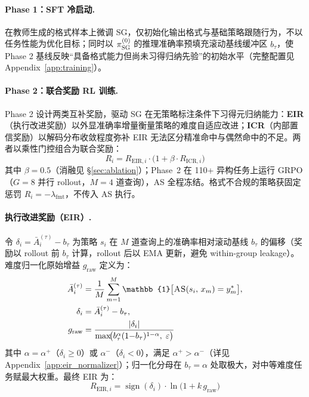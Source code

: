 \documentclass[11pt]{article}
\newcommand{\sg}{\textnormal{\textsc{SG}}}
\newcommand{\as}{\textnormal{\textsc{AS}}}
\begin{document}
\paragraph{Phase 1：SFT 冷启动.}
在教师生成的格式样本上微调 \sg{}，仅初始化输出格式与基础策略跟随行为，不以任务性能为优化目标；同时以 $\pi_{\sg{}}^{(0)}$ 的推理准确率预填充滚动基线缓冲区 $b_\tau$，使 Phase 2 基线反映``具备格式能力但尚未习得归纳先验''的初始水平（完整配置见 Appendix~\ref{app:training}）。

\paragraph{Phase 2：联合奖励 RL 训练.}
Phase 2 设计两类互补奖励，驱动 \sg{} 在无策略标注条件下习得元归纳能力：\textbf{EIR}（执行改进奖励）以外显准确率增量衡量策略的难度自适应改进；\textbf{ICR}（内部置信奖励）以解码分布收敛程度弥补 EIR 无法区分精准命中与偶然命中的不足。两者以乘性门控组合为联合奖励：
\begin{equation}
  R_i = R_{\text{EIR},i} \cdot \bigl(1 + \beta \cdot R_{\text{ICR},i}\bigr)
  \label{eq:total_reward}
\end{equation}
其中 $\beta = 0.5$（消融见 \S\ref{sec:ablation}）；Phase~2 在 110+ 异构任务上运行 GRPO（$G{=}8$ 并行 rollout，$M{=}4$ 道查询），\as{} 全程冻结。格式不合规的策略获固定惩罚 $R_i = -\lambda_\text{fmt}$，不传入 \as{} 执行。

\paragraph{执行改进奖励（EIR）.}
令 $\delta_i = \bar{A}_i^{(\tau)} - b_\tau$ 为策略 $s_i$ 在 $M$ 道查询上的准确率相对滚动基线 $b_\tau$ 的偏移（奖励以 rollout 前 $b_\tau$ 计算，rollout 后以 EMA 更新，避免 within-group leakage）。难度归一化原始增益 $g_{\text{raw}}$ 定义为：
\begin{equation}
\begin{aligned}
  \bar{A}_i^{(\tau)} &= \frac{1}{M}\sum_{m=1}^{M}
    \mathbb{1}\bigl[\as{}(s_i,\,x_m)=y_m^*\bigr],\\
  \delta_i &= \bar{A}_i^{(\tau)} - b_\tau,\\
  g_{\text{raw}} &= \frac{|\delta_i|}{\max\!\bigl(
    b_\tau^{\alpha}(1{-}b_\tau)^{1-\alpha},\;\varepsilon\bigr)}
\end{aligned}
\label{eq:eir_raw}
\end{equation}
其中 $\alpha = \alpha^+$（$\delta_i \geq 0$）或 $\alpha^-$（$\delta_i < 0$），满足 $\alpha^+ > \alpha^-$（详见 Appendix~\ref{app:eir_normalizer}）；归一化分母在 $b_\tau = \alpha$ 处取极大，对中等难度任务赋最大权重。最终 EIR 为：
\begin{equation}
  R_{\text{EIR},i} = \operatorname{sign}(\delta_i) \cdot \ln\!\bigl(1 + k\,g_{\text{raw}}\bigr)
  \label{eq:eir}
\end{equation}
\end{document}

